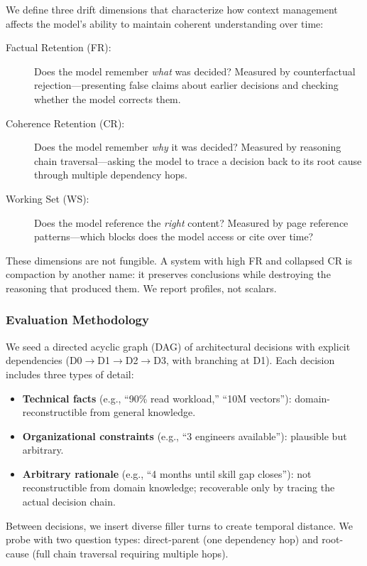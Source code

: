 \documentclass[sigplan,screen,anonymous]{acmart}
\begin{document}
We define three drift dimensions that characterize how context
management affects the model's ability to maintain coherent
understanding over time:

\begin{description}
\item[Factual Retention (FR):] Does the model remember \emph{what}
  was decided? Measured by counterfactual rejection---presenting
  false claims about earlier decisions and checking whether the model
  corrects them.

\item[Coherence Retention (CR):] Does the model remember \emph{why}
  it was decided? Measured by reasoning chain traversal---asking the
  model to trace a decision back to its root cause through multiple
  dependency hops.

\item[Working Set (WS):] Does the model reference the \emph{right}
  content? Measured by page reference patterns---which blocks does
  the model access or cite over time?
\end{description}

These dimensions are not fungible. A system with high FR and collapsed
CR is compaction by another name: it preserves conclusions while
destroying the reasoning that produced them. We report profiles, not
scalars.

\subsubsection{Evaluation Methodology}

We seed a directed acyclic graph (DAG) of architectural decisions with
explicit dependencies (D0$\to$D1$\to$D2$\to$D3, with branching at
D1). Each decision includes three types of detail:

\begin{itemize}
\item \textbf{Technical facts} (e.g., ``90\% read workload,'' ``10M
  vectors''): domain-reconstructible from general knowledge.
\item \textbf{Organizational constraints} (e.g., ``3 engineers
  available''): plausible but arbitrary.
\item \textbf{Arbitrary rationale} (e.g., ``4 months until skill gap
  closes''): not reconstructible from domain knowledge; recoverable
  only by tracing the actual decision chain.
\end{itemize}

Between decisions, we insert diverse filler turns to create temporal
distance. We probe with two question types: direct-parent (one
dependency hop) and root-cause (full chain traversal requiring
multiple hops).
\end{document}
